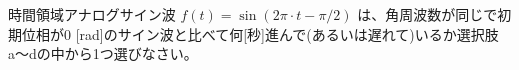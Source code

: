 時間領域アナログサイン波 $f(t) = \sin( 2\pi \cdot t - \pi/2 )$ は、角周波数が同じで初期位相が$0$ [rad]のサイン波と比べて何[秒]進んで(あるいは遅れて)いるか選択肢a〜dの中から1つ選びなさい。
